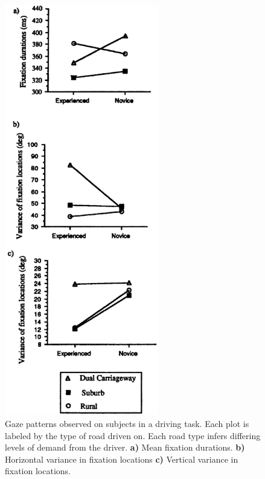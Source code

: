\begin{figure}[h]
    \centering
    \includegraphics[width=0.6\textwidth]{figures/bt_underwood1997.png}
    \caption{Gaze patterns observed on subjects in a driving task. Each plot is labeled by the type of road driven on. Each road type infers differing levels of demand from the driver. \textbf{a)} Mean fixation durations. \textbf{b)} Horizontal variance in fixation locations \textbf{c)} Vertical variance in fixation locations.}
    \label{fig:bt/underwood1997}
\end{figure}

\FloatBarrier